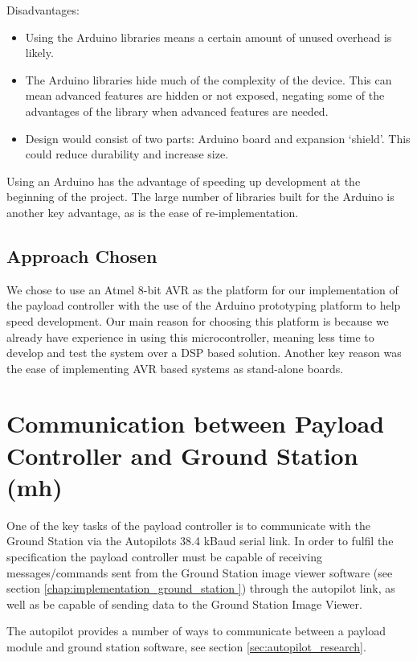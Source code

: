 Disadvantages:
\begin{itemize}
\item Using the Arduino libraries means a certain amount of unused overhead is likely.

\item The Arduino libraries hide much of the complexity of the device. This can mean advanced features are hidden or not exposed, negating some of the advantages of the library when advanced features are needed.

\item Design would consist of two parts: Arduino board and expansion `shield'. This could reduce durability and increase size.
\end{itemize}

Using an Arduino has the advantage of speeding up development at the beginning of the project. The large number of libraries built for the Arduino is another key advantage, as is the ease of re-implementation.

\subsection{Approach Chosen}
We chose to use an Atmel 8-bit AVR as the platform for our implementation of the payload controller with the use of the Arduino prototyping platform to help speed development. Our main reason for choosing this platform is because we already have experience in using this microcontroller, meaning less time to develop and 
test the system over a DSP based solution. Another key reason was the ease of implementing AVR based systems as 
stand-alone boards.

\section{Communication between Payload Controller and Ground Station (mh)}
\label{sec:appro_cons_pl_gs_comms}
One of the key tasks of the payload controller is to communicate with the Ground Station via the Autopilots 38.4 kBaud serial link. In order to fulfil the specification the payload controller must be capable of receiving messages/commands sent from the Ground Station image viewer software (see section \ref{chap:implementation_ground_station }) through the autopilot link, as well as be capable of sending data to the Ground Station Image Viewer.

The autopilot provides a number of ways to communicate between a payload module and ground station software, see section \ref{sec:autopilot_research}.

